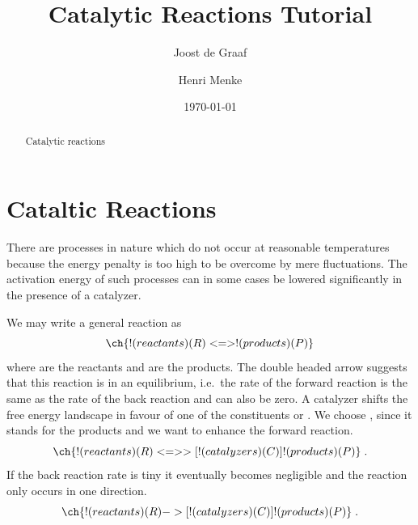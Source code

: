\documentclass[aip,jcp,reprint,a4paper,onecolumn,nofootinbib,amsmath,amssymb]{revtex4-1}
\begin{document}
\title{Catalytic Reactions Tutorial}
\author{Joost de Graaf}
\author{Henri Menke}
\date{\today}

\begin{abstract}
  Catalytic reactions
\end{abstract}

\maketitle

\section{Cataltic Reactions}

There are processes in nature which do not occur at reasonable
temperatures because the energy penalty is too high to be overcome by
mere fluctuations.  The activation energy of such processes can in
some cases be lowered significantly in the presence of a catalyzer.

We may write a general reaction as
\begin{equation}
  \label{eq:equi}
  \ch{!(reactants)(R) <=> !(products)(P)}
\end{equation}
where  are the reactants and  are the products.  The
double headed arrow suggests that this reaction is in an equilibrium,
i.e.~the rate of the forward reaction is the same as the rate of the
back reaction and can also be zero.  A catalyzer shifts the free
energy landscape in favour of one of the constituents  or
.  We choose , since it stands for the products and we
want to enhance the forward reaction.
\begin{equation}
  \ch{!(reactants)(R) <=>>[ !(catalyzers)(C) ] !(products)(P)} \;.
\end{equation}
If the back reaction rate is tiny it eventually becomes negligible and
the reaction only occurs in one direction.
\begin{equation}
  \label{eq:cat}
  \ch{!(reactants)(R) ->[ !(catalyzers)(C) ] !(products)(P)} \;.
\end{equation}
\end{document}
